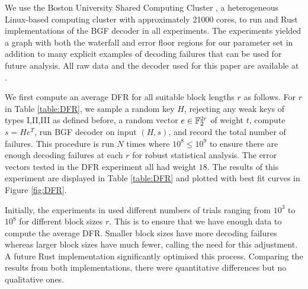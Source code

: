 We use the Boston University Shared Computing Cluster \cite{SCC}, a heterogeneous Linux-based computing cluster with approximately 21000 cores, to run \SageMath{} and Rust implementations of the BGF decoder \cite{BIKE,DGK20a} in all experiments. The experiments yielded a graph with both the waterfall and error floor regions for our parameter set in addition to many explicit examples of decoding failures that can be used for future analysis. All raw data and the decoder used for this paper are available at \cite{raw-data-decoder}.

We first compute an average DFR for all suitable block lengths $r$ as follows.  For $r$ in Table \ref{table:DFR}, we sample a random key $H$, rejecting any weak keys of types I,II,III as defined before, a random vector $e \in \mathbb{F}_2^{2r}$ of weight $t$, compute $s=He^T$, run BGF decoder on input $(H, s)$, and record the total number of failures.  This procedure is run $N$ times where $10^8 \le 10^9$ to ensure there are enough decoding failures at each $r$ for robust statistical analysis.
The error vectors tested in the DFR experiment all had weight $18$. The results of this experiment are displayed in Table \ref{table:DFR} and plotted with best fit curves in Figure \ref{fig:DFR}.

\begin{remark}
Initially, the experiments in \SageMath{} used different numbers of trials ranging from $10^3$ to $10^8$ for different block sizes $r$. This is to ensure that we have enough data to compute the average DFR. Smaller block sizes have more decoding failures whereas larger block sizes have much fewer, calling the need for this adjustment. A future Rust implementation significantly optimised this process. Comparing the results from both implementations, there were quantitative differences but no qualitative ones.
\end{remark}

